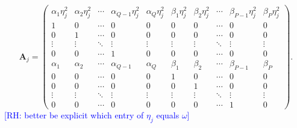 \documentclass[10pt,a4paper,oneside]{article}
\newcommand{\rh}[1]{\textcolor{blue}{\textsf{[RH: #1]}}}
\begin{document}
\[
    \mathbf{A}_j =
    \begin{pmatrix}
        \alpha_1 \eta_j^2 & \alpha_2 \eta_j^2 & \cdots & \alpha_{Q - 1} \eta_j^2 & \alpha_Q \eta_j^2 & \beta_1 \eta_j^2 & \beta_2 \eta_j^2 & \cdots & \beta_{P - 1} \eta_j^2 & \beta_P \eta_j^2 \\
        1                 & 0                 & \cdots & 0                       & 0                 & 0                & 0                & \cdots & 0                      & 0                \\
        0                 & 1                 & \cdots & 0                       & 0                 & 0                & 0                & \cdots & 0                      & 0                \\
        \vdots            & \vdots            & \ddots & \vdots                  & \vdots            & \vdots           & \vdots           & \ddots & \vdots                 & \vdots           \\
        0                 & 0                 & \cdots & 1                       & 0                 & 0                & 0                & \cdots & 0                      & 0                \\
        \alpha_1          & \alpha_2          & \cdots & \alpha_{Q - 1}          & \alpha_Q          & \beta_1          & \beta_2          & \cdots & \beta_{P - 1}          & \beta_P          \\
        0                 & 0                 & \cdots & 0                       & 0                 & 1                & 0                & \cdots & 0                      & 0                \\
        0                 & 0                 & \cdots & 0                       & 0                 & 0                & 1                & \cdots & 0                      & 0                \\
        \vdots            & \vdots            & \ddots & \vdots                  & \vdots            & \vdots           & \vdots           & \ddots & \vdots                 & \vdots           \\
        0                 & 0                 & \cdots & 0                       & 0                 & 0                & 0                & \cdots & 1                      & 0
    \end{pmatrix}.
\]
\rh{better be explicit which entry of $\eta_j$ equals $\omega$}
\end{document}
